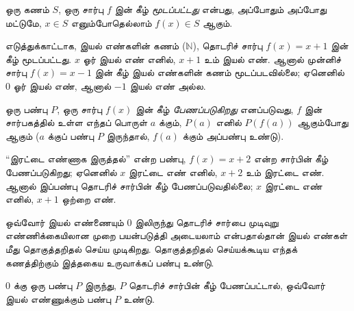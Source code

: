 \documentclass[11pt,a4paper,openany]{memoir}
\begin{document}
\begin{defn}
ஒரு கணம் $S$, ஒரு சார்பு $f$ இன் கீழ் \emph{மூடப்பட்டது}
என்பது, அப்போதும் அப்போது மட்டுமே, $x \in S$ எனும்போதெல்லாம்
$f(x) \in S$ ஆகும்.
\end{defn}

\begin{explain}
எடுத்துக்காட்டாக, இயல் எண்களின் கணம் ($\mathbb{N}$),
தொடரிச் சார்பு $f(x) = x+1$ இன் கீழ் மூடப்பட்டது.
$x$ ஓர் இயல் எண் எனில், $x+1$ உம் இயல் எண்.
ஆனால் முன்னிச் சார்பு $f(x) = x-1$ இன் கீழ் இயல் எண்களின்
கணம் மூடப்படவில்லை; ஏனெனில் $0$ ஓர் இயல் எண்,
ஆனால் $-1$ இயல் எண் அல்ல.
\end{explain}

\begin{defn}
ஒரு பண்பு $P$, ஒரு சார்பு $f(x)$ இன் கீழ் \emph{பேணப்படுகிறது}
எனப்படுவது, $f$ இன் சார்பகத்தில் உள்ள எந்தப் பொருள் $a$ க்கும்,
$P(a)$ எனில் $P(f(a))$ ஆகும்போது ஆகும்
($a$ க்குப் பண்பு $P$ இருந்தால், $f(a)$ க்கும் அப்பண்பு உண்டு).
\end{defn}

\begin{explain}
``இரட்டை எண்ணாக இருத்தல்'' என்ற பண்பு, $f(x) = x+2$
என்ற சார்பின் கீழ் பேணப்படுகிறது; ஏனெனில் $x$ இரட்டை எண்
எனில், $x+2$ உம் இரட்டை எண். ஆனால் இப்பண்பு தொடரிச்
சார்பின் கீழ் பேணப்படுவதில்லை; $x$ இரட்டை எண் எனில்,
$x+1$ ஒற்றை எண்.

ஒவ்வோர் இயல் எண்ணையும் 0 இலிருந்து தொடரிச் சார்பை முடிவுறு
எண்ணிக்கையிலான முறை பயன்படுத்தி அடையலாம் என்பதால்தான்
இயல் எண்கள் மீது தொகுத்தறிதல் செய்ய முடிகிறது.
தொகுத்தறிதல் செய்யக்கூடிய எந்தக் கணத்திற்கும் இத்தகைய
உருவாக்கப் பண்பு உண்டு.
\end{explain}

\begin{defn}[$\Nat$ மீது தொகுத்தறிதல்]
0 க்கு ஒரு பண்பு $P$ இருந்து, $P$ தொடரிச் சார்பின் கீழ்
பேணப்பட்டால், ஒவ்வோர் இயல் எண்ணுக்கும் பண்பு $P$ உண்டு.
\end{defn}
\end{document}
